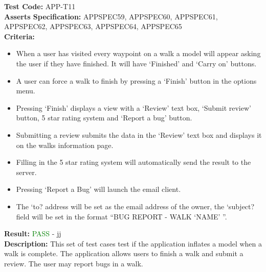 \documentclass[11pt,a4paper]{report}
\begin{document}
\label{test:APP-T11}
\noindent\textbf{Test Code:} APP-T11\\
\textbf{Asserts Specification:} APPSPEC59, APPSPEC60, APPSPEC61, APPSPEC62, APPSPEC63, APPSPEC64, APPSPEC65\\ 
\textbf{Criteria:} \begin{itemize}
                     \item When a user has visited every waypoint on a walk a model will appear asking the user if they have finished. It will have `Finished' and `Carry on' buttons.
                     \item A user can force a walk to finish by pressing a `Finish' button in the options menu.
                     \item Pressing `Finish' displays a view with a `Review' text box, `Submit review' button, 5 star rating system and `Report a bug' button.
                     \item Submitting a review submits the data in the `Review' text box and displays it on the walks information page.
                     \item Filling in the 5 star rating system will automatically send the result to the server.
                     \item Pressing `Report a Bug' will launch the email client.
                     \item The `to? address will be set as the email address of the owner, the `subject? field will be set in the format ``BUG REPORT - WALK `NAME' ''.
                   \end{itemize}
\textbf{Result:} \textcolor{green}{PASS} - jj\\
\textbf{Description:} This set of test cases test if the application inflates a model when a walk is complete. The application allows users to finish a walk and submit a review. The user may report bugs in a walk.\\
\end{document}
